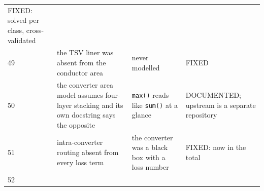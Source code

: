 \documentclass[10pt,]{article}
\begin{document}
\begin{longtable}[]{@{}llll@{}}
\begin{minipage}[t]{0.22\columnwidth}
FIXED: solved per class, cross-validated\strut
\end{minipage}\tabularnewline
\begin{minipage}[t]{0.22\columnwidth}\raggedright
49\strut
\end{minipage} & \begin{minipage}[t]{0.22\columnwidth}\raggedright
the TSV liner was absent from the conductor area\strut
\end{minipage} & \begin{minipage}[t]{0.22\columnwidth}\raggedright
never modelled\strut
\end{minipage} & \begin{minipage}[t]{0.22\columnwidth}\raggedright
FIXED\strut
\end{minipage}\tabularnewline
\begin{minipage}[t]{0.22\columnwidth}\raggedright
50\strut
\end{minipage} & \begin{minipage}[t]{0.22\columnwidth}\raggedright
the converter area model assumes four-layer stacking and its own
docstring says the opposite\strut
\end{minipage} & \begin{minipage}[t]{0.22\columnwidth}\raggedright
\texttt{max()} reads like \texttt{sum()} at a glance\strut
\end{minipage} & \begin{minipage}[t]{0.22\columnwidth}\raggedright
DOCUMENTED; upstream is a separate repository\strut
\end{minipage}\tabularnewline
\begin{minipage}[t]{0.22\columnwidth}\raggedright
51\strut
\end{minipage} & \begin{minipage}[t]{0.22\columnwidth}\raggedright
intra-converter routing absent from every loss term\strut
\end{minipage} & \begin{minipage}[t]{0.22\columnwidth}\raggedright
the converter was a black box with a loss number\strut
\end{minipage} & \begin{minipage}[t]{0.22\columnwidth}\raggedright
FIXED: now in the total\strut
\end{minipage}\tabularnewline
\begin{minipage}[t]{0.22\columnwidth}\raggedright
52\strut
\end{minipage} & \begin{minipage}[t]{0.22\columnwidth}\raggedright

\end{minipage}
\end{longtable}
\end{document}

